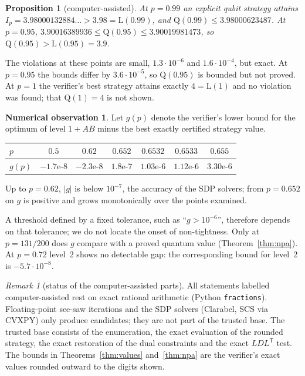 \documentclass[10pt,twocolumn,a4paper]{article}
\newtheorem{proposition}[theorem]{Proposition}
\theoremstyle{definition}
\newtheorem{observation}{Numerical observation}
\theoremstyle{remark}
\newtheorem{remark}{Remark}
\newcommand{\Q}{\mathrm{Q}}
\newcommand{\Lc}{\mathrm{L}}
\begin{document}
\begin{proposition}[computer-assisted]\label{prop:viol}
At $p=0.99$ an explicit qubit strategy attains $I_p = 3.98000132884\ldots > 3.98 = \Lc(0.99)$, and
$\Q(0.99)\le 3.98000623487$. At $p=0.95$,
$3.90016389936 \le \Q(0.95) \le 3.90019981473$, so $\Q(0.95)>\Lc(0.95)=3.9$.
\end{proposition}

The violations at these points are small, $1.3\cdot10^{-6}$ and $1.6\cdot10^{-4}$, but exact. At $p=0.95$ the bounds differ by
$3.6\cdot10^{-5}$, so $\Q(0.95)$ is bounded but not proved. At $p=1$ the verifier's best strategy attains exactly $4=\Lc(1)$ and no
violation was found; that $\Q(1)=4$ is not shown.

\begin{observation}\label{obs:gap}
Let $g(p)$ denote the verifier's lower bound for the optimum of level $1{+}AB$ minus the best exactly certified strategy value.
\begin{center}
\begin{tabular}{@{}lcccccc@{}}
\toprule
$p$ & $0.5$ & $0.62$ & $0.652$ & $0.6532$ & $0.6533$ & $0.655$\\
\midrule
$g(p)$ & $-1.7\text{e-}8$ & $-2.3\text{e-}8$ & $1.8\text{e-}7$ & $1.03\text{e-}6$ & $1.12\text{e-}6$ & $3.30\text{e-}6$\\
\bottomrule
\end{tabular}
\end{center}
Up to $p=0.62$, $|g|$ is below $10^{-7}$, the accuracy of the SDP solvers; from $p=0.652$ on $g$ is positive and grows
monotonically over the points examined.
\end{observation}

A threshold defined by a fixed tolerance, such as ``$g>10^{-6}$'', therefore depends on that tolerance; we do not locate the onset
of non-tightness. Only at $p=131/200$ does $g$ compare with a proved quantum value (Theorem~\ref{thm:npa}). At $p=0.72$ level~2
shows no detectable gap: the corresponding bound for level~2 is $-5.7\cdot10^{-8}$.

\begin{remark}[status of the computer-assisted parts]\label{rem:status}
All statements labelled computer-assisted rest on exact rational arithmetic (Python \texttt{fractions}). Floating-point
see-saw iterations and the SDP solvers (Clarabel, SCS via CVXPY) only produce candidates; they are not part of the trusted base.
The trusted base consists of the enumeration, the exact evaluation of the rounded strategy, the exact restoration of the dual
constraints and the exact $LDL^{\mathsf T}$ test. The bounds in Theorems~\ref{thm:values} and~\ref{thm:npa} are the verifier's
exact values rounded outward to the digits shown.
\end{remark}
\end{document}
